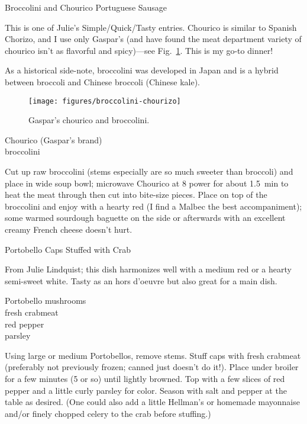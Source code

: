 \begin{entry}{Broccolini and Chourico Portuguese Sausage}

\begin{open}
    This is one of Julie's Simple/Quick/Tasty entries.  Chourico is similar to
    Spanish Chorizo, and I use only Gaspar’s (and have found the meat department
    variety of chourico isn’t as flavorful and spicy)---see
    Fig.~\ref{fig:chourico}. This is my go-to dinner!

    As a historical side-note, broccolini was developed in Japan and is a hybrid
    between broccoli and Chinese broccoli (Chinese kale).
\end{open}
\begin{figure}
  \centering
  \texttt{[image: figures/broccolini-chourizo]}
  \caption{Gaspar's chourico and broccolini.}
  \label{fig:chourico}
\end{figure}
\begin{ingredients}
    Chourico (Gaspar's brand)\\
    broccolini
\end{ingredients}
Cut up raw broccolini (stems especially are so much sweeter than broccoli) and
place in wide soup bowl; microwave Chourico at 8 power for about
\SI{1.5}{\minute} to heat the meat through then cut into bite-size pieces.
Place on top of the broccolini and enjoy with a hearty red (I find a Malbec the
best accompaniment); some warmed sourdough baguette on the side or afterwards
with an excellent creamy French cheese doesn’t hurt.
\end{entry}

\begin{entry}{Portobello Caps Stuffed with Crab
}

\begin{open}
  From Julie Lindquist; this dish harmonizes well with a medium red or a
  hearty semi-sweet white. Tasty as an hors d'oeuvre but also great for a main
  dish.
\end{open}
\begin{ingredients}
    Portobello mushrooms\\
    fresh crabmeat\\
    red pepper\\
    parsley
\end{ingredients}
Using large or medium Portobellos, remove stems. Stuff caps with fresh
crabmeat (preferably not previously frozen; canned just doesn't do it!). Place
under broiler for a few minutes (5 or so) until lightly browned. Top with a
few slices of red pepper and a little curly parsley for color. Season with
salt and pepper at the table as desired.  (One could also add a little
Hellman’s or homemade mayonnaise and/or finely chopped celery to the crab
before stuffing.)
\end{entry}

